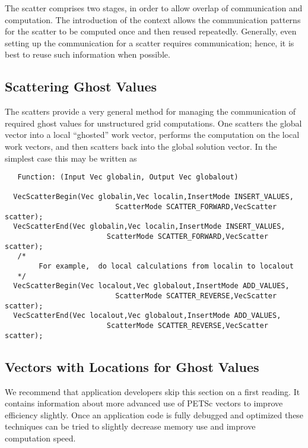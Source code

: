 The scatter comprises two stages, in order to allow overlap of 
communication and computation. The introduction of the 
 context allows the communication patterns for the scatter
to be computed once and then reused repeatedly. Generally, even 
setting up the communication for a scatter requires communication; 
hence, it is best to reuse such information when possible.

\subsection{Scattering Ghost Values}

The scatters provide a very general method for managing the communication of 
required ghost values for unstructured grid computations. One scatters
the global vector into a local ``ghosted'' work vector, performs the computation
on the local work vectors, and then scatters back into the global solution 
vector. In the simplest case this may be written as
\begin{verbatim}
   Function: (Input Vec globalin, Output Vec globalout)

  VecScatterBegin(Vec globalin,Vec localin,InsertMode INSERT_VALUES,
                          ScatterMode SCATTER_FORWARD,VecScatter scatter);
  VecScatterEnd(Vec globalin,Vec localin,InsertMode INSERT_VALUES,
                        ScatterMode SCATTER_FORWARD,VecScatter scatter);
   /*
        For example,  do local calculations from localin to localout 
   */
  VecScatterBegin(Vec localout,Vec globalout,InsertMode ADD_VALUES,
                          ScatterMode SCATTER_REVERSE,VecScatter scatter);
  VecScatterEnd(Vec localout,Vec globalout,InsertMode ADD_VALUES,
                        ScatterMode SCATTER_REVERSE,VecScatter scatter);
\end{verbatim}

\subsection{Vectors with Locations for Ghost Values}

We recommend that application developers skip this section on a first reading.
It contains information about more advanced use of PETSc vectors to improve 
efficiency slightly. Once an application code is fully debugged and optimized
these techniques can be tried to slightly decrease memory use and improve 
computation speed.

